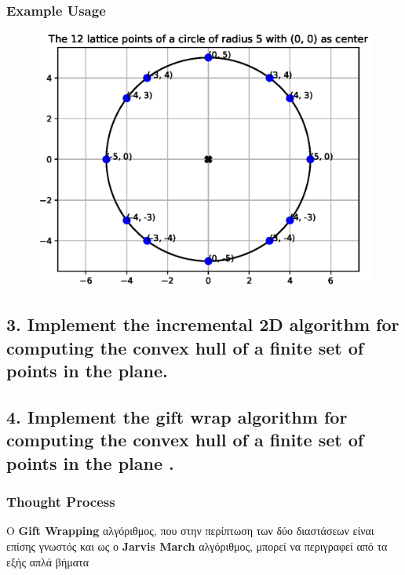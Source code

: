 \documentclass[12pt]{article}
\newenvironment{matlab}
	{\begin{figure}[H]\centering\captionsetup{justification=centering}}
	{\end{figure}}
\begin{document}
\subsubsection*{Example Usage}

\begin{matlab}
    \includegraphics[scale=1]{images/lattice_points.eps}
\end{matlab}

\pagebreak

\subsection*{3. Implement the incremental 2D algorithm for computing the convex hull of a
finite set of points in the plane.}

\pagebreak

\subsection*{4. Implement the gift wrap algorithm for computing the convex hull of a finite
set of points in the plane .}

\subsubsection*{Thought Process}

Ο \textbf{Gift Wrapping} αλγόριθμος, που στην περίπτωση των δύο διαστάσεων είναι
επίσης γνωστός και ως ο \textbf{Jarvis March} αλγόριθμος, μπορεί να περιγραφεί από τα εξής
απλά βήματα \\
\end{document}

